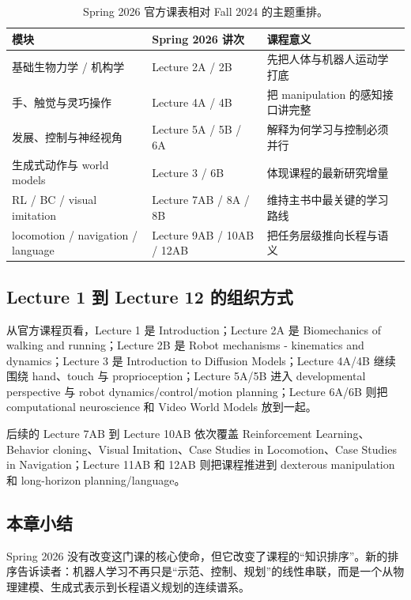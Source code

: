 \documentclass[a4paper]{article}
\begin{document}
\begin{table}[H]
\centering
\small
\begin{tabular}{@{}p{}p{}p{}@{}}
\toprule
模块 & Spring 2026 讲次 & 课程意义 \\
\midrule
基础生物力学 / 机构学 & Lecture 2A / 2B & 先把人体与机器人运动学打底 \\
手、触觉与灵巧操作 & Lecture 4A / 4B & 把 manipulation 的感知接口讲完整 \\
发展、控制与神经视角 & Lecture 5A / 5B / 6A & 解释为何学习与控制必须并行 \\
生成式动作与 world models & Lecture 3 / 6B & 体现课程的最新研究增量 \\
RL / BC / visual imitation & Lecture 7AB / 8A / 8B & 维持主书中最关键的学习路线 \\
locomotion / navigation / language & Lecture 9AB / 10AB / 12AB & 把任务层级推向长程与语义 \\
\bottomrule
\end{tabular}
\caption{Spring 2026 官方课表相对 Fall 2024 的主题重排。}
\end{table}

\subsection{Lecture 1 到 Lecture 12 的组织方式}

从官方课程页看，Lecture 1 是 Introduction；Lecture 2A 是 Biomechanics of walking and running；Lecture 2B 是 Robot mechanisms - kinematics and dynamics；Lecture 3 是 Introduction to Diffusion Models；Lecture 4A/4B 继续围绕 hand、touch 与 proprioception；Lecture 5A/5B 进入 developmental perspective 与 robot dynamics/control/motion planning；Lecture 6A/6B 则把 computational neuroscience 和 Video World Models 放到一起。

后续的 Lecture 7AB 到 Lecture 10AB 依次覆盖 Reinforcement Learning、Behavior cloning、Visual Imitation、Case Studies in Locomotion、Case Studies in Navigation；Lecture 11AB 和 12AB 则把课程推进到 dexterous manipulation 和 long-horizon planning/language。

\subsection{本章小结}

Spring 2026 没有改变这门课的核心使命，但它改变了课程的“知识排序”。新的排序告诉读者：机器人学习不再只是“示范、控制、规划”的线性串联，而是一个从物理建模、生成式表示到长程语义规划的连续谱系。
\end{document}
